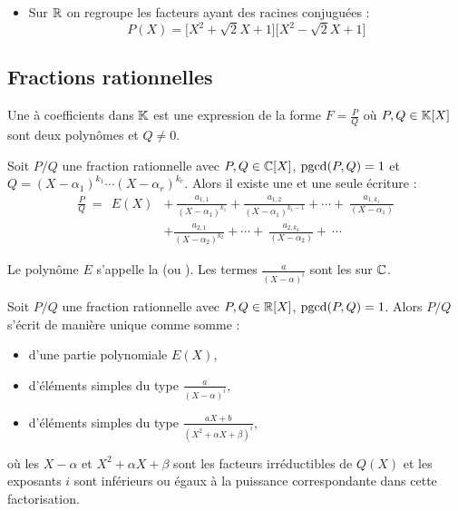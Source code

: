 \documentclass[10pt,class=article,crop=false]{standalone}
\begin{document}
\begin{multicols}{2}
\begin{exemple}
\begin{itemize}
	\item Sur $\mathbb{R}$ on regroupe les facteurs ayant des racines conjuguées :
	$$P(X) = \big[X^2+\sqrt2X+1\big]\big[X^2-\sqrt2X+1\big]$$ 
\end{itemize}
\end{exemple}

\subsection{Fractions rationnelles}


Une  à coefficients dans $\mathbb{K}$ est une expression de la forme
$F=\frac{P}{Q}$ où $P,Q \in \mathbb{K}[X]$ sont deux polynômes et $Q \neq 0$.





\begin{theoreme}
	Soit $P/Q$ une fraction rationnelle avec $P,Q \in \mathbb{C}[X]$, $\mathop{\text{pgcd}}(P,Q)=1$ et
	$Q=(X-\alpha_1)^{k_1}\cdots(X-\alpha_r)^{k_r}$.
	Alors il existe une et une seule écriture :
	$$\begin{array}{rl}
		\displaystyle \frac{P}{Q} \  =  \ \  E(X)  & + \
		\displaystyle  \frac{a_{1,1}}{(X-\alpha_1)^{k_1}}+\frac{a_{1,2}}{(X-\alpha_1)^{k_1-1}}+\cdots
		+\ \frac{a_{1,k_1}}{(X-\alpha_1)} \\[4mm]
		& \displaystyle+ \frac{a_{2,1}}{(X-\alpha_2)^{k_2}}+\cdots
		+\ \frac{a_{2,k_2}}{(X-\alpha_2)}  + \ \cdots
	\end{array}$$
\end{theoreme}

Le polynôme $E$ s'appelle la  
(ou \defi{partie entière}).
Les termes $\frac{a}{(X-\alpha)^i}$ sont les  sur $\mathbb{C}$.



\begin{theoreme}
	Soit $P/Q$ une fraction rationnelle avec $P,Q \in \mathbb{R}[X]$, $\mathop{\text{pgcd}}(P,Q)=1$.
	Alors $P/Q$ s'écrit de manière unique comme somme :
	\begin{itemize}
		\item d'une partie polynomiale $E(X)$,
		\item d'éléments simples du type $\frac{a}{(X-\alpha)^i}$,
		\item d'éléments simples du type $\frac{aX+b}{(X^2+\alpha X + \beta)^i}$,
	\end{itemize}
	où les $X-\alpha$ et $X^2+\alpha X + \beta$ sont les facteurs irréductibles de $Q(X)$
	et les exposants $i$ sont inférieurs ou égaux à la puissance correspondante dans cette factorisation.
\end{theoreme}




\end{multicols}
\end{document}
